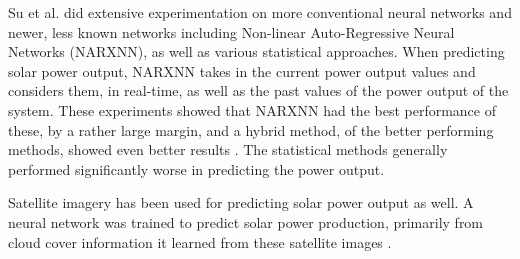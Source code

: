 Su et al. \cite{su_machine_2019} did extensive experimentation on more conventional neural networks and newer, less known networks including  Non-linear Auto-Regressive Neural Networks (NARXNN), as well as various statistical approaches. When predicting solar power output, NARXNN takes in the current power output values and considers them, in real-time, as well as the past values of the power output of the system. These experiments showed that NARXNN had the best performance of these, by a rather large margin, and a hybrid method, of the better performing methods, showed even better results \cite{anderson_using_2018}. The statistical methods generally performed significantly worse in predicting the power output. 

Satellite imagery has been used for predicting solar power output as well. A neural network was trained to predict solar power production, primarily from cloud cover information it learned from these satellite images \cite{jang_solar_2016}.
